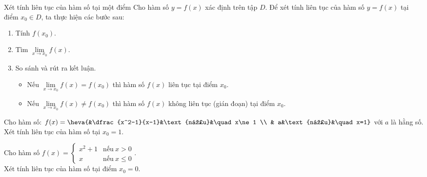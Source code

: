 \begin{dang}{Xét tính liên tục của hàm số tại một điểm}
Cho hàm số $y=f(x)$ xác định trên tập $D$. Để xét tính liên tục của hàm số $y=f(x)$ tại điểm $x_{0}\in D$, ta thực hiện các bước sau:
\begin{enumerate}[Bước 1.]
	\item Tính $f(x_0)$.
	\item Tìm $\lim\limits_{x\to x_0}f(x)$.
	\item So sánh và rút ra kết luận.
	\begin{itemize}
		\item Nếu $\lim\limits_{x\to x_0}f(x)=f(x_0)$ thì hàm số $f(x)$ liên tục tại điểm $x_0$.
		\item Nếu $\lim\limits_{x\to x_0}f(x)\ne f(x_0)$ thì hàm số $f(x)$ không liên tục (gián đoạn) tại điểm $x_0$.
	\end{itemize}
\end{enumerate}
\end{dang}
\begin{vd}%
	Cho hàm số: $f(x)=\heva{&\dfrac{x^2-1}{x-1}&\text{nếu}&\quad x\ne  1 \\ 
		& a&\text{nếu}&\quad x=1}$ với $a$ là hằng số. \\
	Xét tính liên tục của hàm số tại $x_0=1$.
\end{vd}
\begin{vd}%
	Cho hàm số $f(x)=\begin{cases}
	x^2+1&\text{nếu}\:x>0\\
	x&\text{nếu}\:x\leq0
	\end{cases}$.\\
	Xét tính liên tục của hàm số tại điểm $x_0=0$.
\end{vd}
